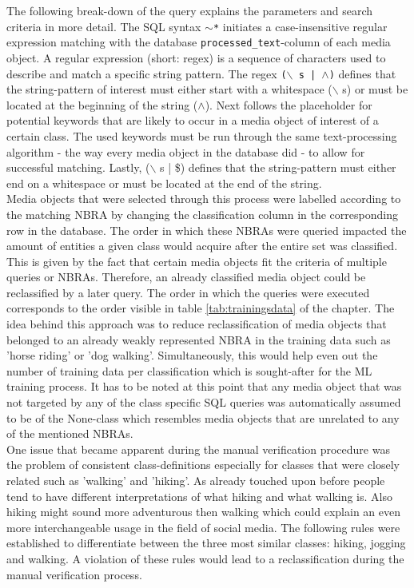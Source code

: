 The following break-down of the query explains the parameters and search criteria in more detail. The SQL syntax \texttt{$\sim$*} initiates a case-insensitive regular expression matching with the database \texttt{processed\_text}-column of each media object. A regular expression (short: regex) is a sequence of characters used to describe and match a specific string pattern. The regex \texttt{($\backslash$ s | $\wedge$)} defines that the string-pattern of interest must either start with a whitespace ($\backslash$ s) or must be located at the beginning of the string ($\wedge$). Next follows the placeholder for potential keywords that are likely to occur in a media object of interest of a certain class. The used keywords must be run through the same text-processing algorithm - the way every media object in the database did - to allow for successful matching. Lastly, ($\backslash$ s | \$) defines that the string-pattern must either end on a whitespace or must be located at the end of the string.\\ 
Media objects that were selected through this process were labelled according to the matching NBRA by changing the classification column in the corresponding row in the database. The order in which these NBRAs were queried impacted the amount of entities a given class would acquire after the entire set was classified. This is given by the fact that certain media objects fit the criteria of multiple queries or NBRAs. Therefore, an already classified media object could be reclassified by a later query. The order in which the queries were executed corresponds to the order visible in table \ref{tab:trainingsdata} of the  chapter. The idea behind this approach was to reduce reclassification of media objects that belonged to an already weakly represented NBRA in the training data such as 'horse riding' or 'dog walking'. Simultaneously, this would help even out the number of training data per classification which is sought-after for the ML training process. It has to be noted at this point that any media object that was not targeted by any of the class specific SQL queries was automatically assumed to be of the None-class which resembles media objects that are unrelated to any of the mentioned NBRAs.\\

One issue that became apparent during the manual verification procedure was the problem of consistent class-definitions especially for classes that were closely related such as 'walking' and 'hiking'. As already touched upon before people tend to have different interpretations of what hiking and what walking is. Also hiking might sound more adventurous then walking which could explain an even more interchangeable usage in the field of social media. The following rules were established to differentiate between the three most similar classes: hiking, jogging and walking. A violation of these rules would lead to a reclassification during the manual verification process.

